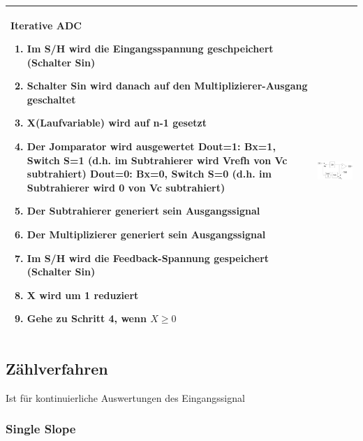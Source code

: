 \begin{longtable}{|p{12cm}|c|}
  {\textbf{Iterative ADC}
  \begin{enumerate}
    \item Im S/H wird die Eingangsspannung geschpeichert (Schalter Sin)
    \item Schalter Sin wird danach auf den Multiplizierer-Ausgang geschaltet
    \item X(Laufvariable) wird auf n-1 gesetzt
    \item Der Jomparator wird ausgewertet\newline
      Dout=1: Bx=1, Switch S=1 (d.h. im Subtrahierer wird Vrefh von Vc
      subtrahiert)\newline
      Dout=0: Bx=0, Switch S=0 (d.h. im Subtrahierer wird 0 von Vc
      subtrahiert)
    \item Der Subtrahierer generiert sein Ausgangssignal
    \item Der Multiplizierer generiert sein Ausgangssignal
    \item Im S/H wird die Feedback-Spannung gespeichert (Schalter Sin)
    \item X wird um 1 reduziert
    \item Gehe zu Schritt 4, wenn $X\geq0$
  \end{enumerate}
  }
  &
  \includegraphics[width=6cm, valign=t]{pictures/iterativeADC}\\
\hline
\end{longtable}



\subsection{Zählverfahren } 
Ist für kontinuierliche Auswertungen des Eingangssignal
\subsubsection{Single Slope}

